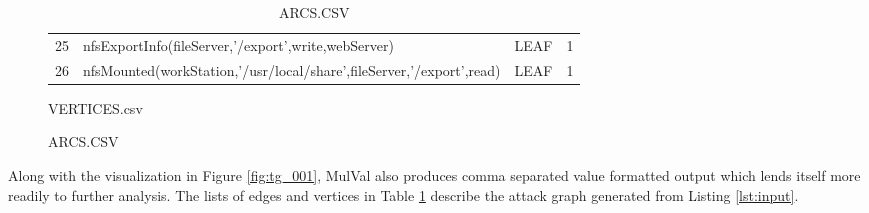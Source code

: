 \begin{table}[ht]
\begin{subfigure}[t]{0.6\textwidth}
{\begin{tabular}[t]{@{}llll@{}}
25 & nfsExportInfo(fileServer,'/export',write,webServer) & LEAF & 1 \\
26 & nfsMounted(workStation,'/usr/local/share',fileServer,'/export',read) & LEAF & 1 \\ \bottomrule
\end{tabular}%
}
\caption{VERTICES.csv}
\label{tab:eg_verts}
\end{subfigure}
\begin{subfigure}[t]{0.3\textwidth}
\flushright
{}
\caption{ARCS.CSV}
\label{tab:eg_arcs}
\end{subfigure}
    \label{tab:mulval_out}
\end{table}

Along with the visualization in Figure \ref{fig:tg_001}, MulVal also produces comma separated value formatted output which lends itself more readily to further analysis. The lists of edges and vertices in Table \ref{tab:mulval_out} describe the attack graph generated from Listing \ref{lst:input}.